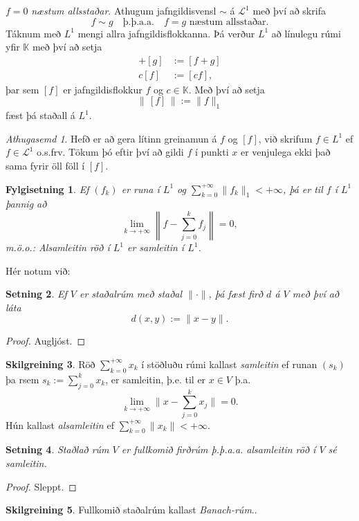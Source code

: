 \documentclass[a4paper,icelandic,11pt]{book}
\theoremstyle{plain}      \newtheorem{setn}{Setning}[chapter]
\newtheorem{fylgi}[setn]{Fylgisetning}
\theoremstyle{definition} \newtheorem{skilgr}[setn]{Skilgreining}
\theoremstyle{remark}     \newtheorem*{ath}{Athugasemd}
\begin{document}
$f=0$ \emph{næstum allsstaðar}. Athugum jafngildisvensl $\sim$ á
$\mathcal L^{1}$ með því að skrifa
\[
f\sim g
\quad\text{þ.þ.a.a.}\quad
f = g \text{ næstum allsstaðar}.
\]
Táknum með $L^{1}$ mengi allra jafngildisflokkanna. Þá verður
$L^{1}$ að línulegu rúmi yfir $\mathbb K$ með því að setja
\begin{align*}
  [f] + [g] &:= [f+g] \\
  c[f] &:= [cf],
\end{align*}
þar sem $[f]$ er jafngildisflokkur $f$ og $c\in\mathbb K$. Með því að
setja
\[
\|\,[f]\,\| := \| f \|_{1}
\]
fæst þá staðall á $L^{1}$.
\begin{ath}
  Hefð er að gera lítinn greinamun á $f$ og $[f]$, við skrifum
  $f\in L^{1}$ ef $f\in\mathcal L^{1}$ o.s.frv. Tökum þó eftir
  því að gildi $f$ í punkti $x$ er venjulega ekki það sama fyrir öll
  föll í $[f]$.
\end{ath}
\begin{fylgi}
  Ef $(f_{k})$ er runa í $L^{1}$ og
  $\sum_{k=0}^{+\infty}\|f_{k}\|_{1}<+\infty$, þá er til $f$ í $L^{1}$
  þannig að
  \[
  \lim_{k\to+\infty}\left\|
    f-\sum_{j=0}^{k}f_{j}
  \right\|
  = 0,
  \]
  m.ö.o.: Alsamleitin röð í $L^{1}$ er samleitin í $L^{1}$.
\end{fylgi}
Hér notum við:
\begin{setn}
  Ef $V$ er staðalrúm með staðal $\|\cdot\|$, þá fæst firð $d$ á $V$
  með því að láta
  \[
  d(x,y) := \| x - y \|.
  \]
\end{setn}
\begin{proof}
  Augljóst.
\end{proof}
\begin{skilgr}
  Röð $\sum_{k=0}^{+\infty}x_{k}$ í stöðluðu rúmi kallast
  \emph{samleitin} ef
  runan $(s_{k})$ þa rsem $s_{k}:=\sum_{j=0}^{k}x_{k}$, er samleitin,
  þ.e. til er $x\in V$ þ.a.
  \[
  \lim_{k\to+\infty}\| x - \sum_{j=0}^{k} x_{j} \| = 0.
  \]
  Hún kallast \emph{alsamleitin} ef
  $\sum_{k=0}^{+\infty}\|x_{k}\|<+\infty$.
\end{skilgr}
\begin{setn}
  Staðlað rúm $V$ er fullkomið firðrúm þ.þ.a.a. alsamleitin röð í $V$
  sé samleitin.
\end{setn}
\begin{proof}
  Sleppt.
\end{proof}
\begin{skilgr}
  Fullkomið staðalrúm kallast
  \emph{Banach-rúm}..
\end{skilgr}
\end{document}
